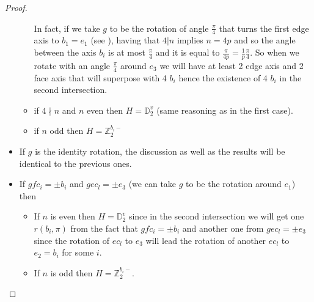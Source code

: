 \documentclass[11pt,a4paper]{amsart}
\theoremstyle{definition}
\newcommand{\ZZ}{\mathbb{Z}}                %
\newcommand{\DD}{\mathbb{D}}                %
\newcommand{\1}{\mathds{1}}		            %
\begin{document}
\begin{proof}
\begin{itemize}
\begin{itemize}
In fact, if we take $g$ to be the rotation of angle $\frac{\pi}{4}$ that turns the first edge axis to $b_1=e_1$ (see \cite[figure 10]{olive2019}), having that $4|n$ implies $n=4p$ and so the angle between the axis $b_i$ is at most $\frac{\pi}{4}$ and it is equal to $\frac{\pi}{4p}=\frac{1}{p}\frac{\pi}{4}$. So when we rotate with an angle $\frac{\pi}{4}$ around $e_3$ we will have at least 2 edge axis and 2 face axis that will superpose with 4 $b_i$ hence the existence of 4 $b_i$ in the second intersection.
\item if $4\nmid n$ and $n$ even then $H=\DD_2^v$ (same reasoning as in the first case).
\item if $n$ odd then $H=\ZZ_2^{b_i-}$
\end{itemize}
\item If $g$ is the identity rotation, the discussion as well as the results will be identical to the previous ones.
\item If $gfc_i=\pm b_i$ and $gec_l=\pm e_3$ (we can take $g$ to be the rotation around $e_1$) then
\begin{itemize}
\item If $n$ is even then $H=\DD_2^v$ since in the second intersection we will get one $r(b_i,\pi)$ from the fact that $gfc_i=\pm b_i$ and another one from $gec_l=\pm e_3$ since the rotation of $ec_l$ to $e_3$ will lead the rotation of another $ec_l$ to $e_2=b_i$ for some $i$.
\item If $n$ is odd then $H=\ZZ_2^{b_i-}$.
\end{itemize}
\end{itemize}
\end{proof}
\end{document}
